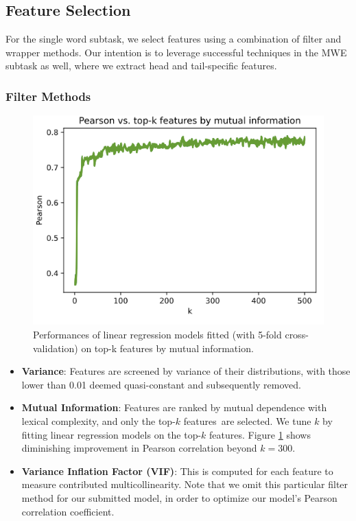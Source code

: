 \documentclass{dcthesis}
\theoremstyle{definition}
\theoremstyle{remark}
\begin{document}
\subsection{Feature Selection}

For the single word subtask, we select features using a combination of filter and wrapper methods. Our intention is to leverage successful techniques in the MWE subtask as well, where we extract head and tail-specific features.

\subsubsection{Filter Methods}

\begin{figure}
  \centering
  \includegraphics[scale=0.6]{mi.png}
  \caption{\label{fig:mi} Performances of linear regression models fitted (with 5-fold cross-validation) on top-k features by mutual information.}
\end{figure}

\begin{itemize}
  \item \textbf{Variance}: Features are screened by variance of their distributions, with those lower than 0.01 deemed quasi-constant and subsequently removed.
  \item \textbf{Mutual Information}: Features are ranked by mutual dependence with lexical complexity, and only the top-$k$ features are selected. We tune $k$ by fitting linear regression models on the top-$k$ features. Figure \ref{fig:mi} shows diminishing improvement in Pearson correlation beyond $k=300$.
  \item \textbf{Variance Inflation Factor (VIF)}: This is computed for each feature to measure contributed multicollinearity. Note that we omit this particular filter method for our submitted model, in order to optimize our model's Pearson correlation coefficient.
\end{itemize}
\end{document}
